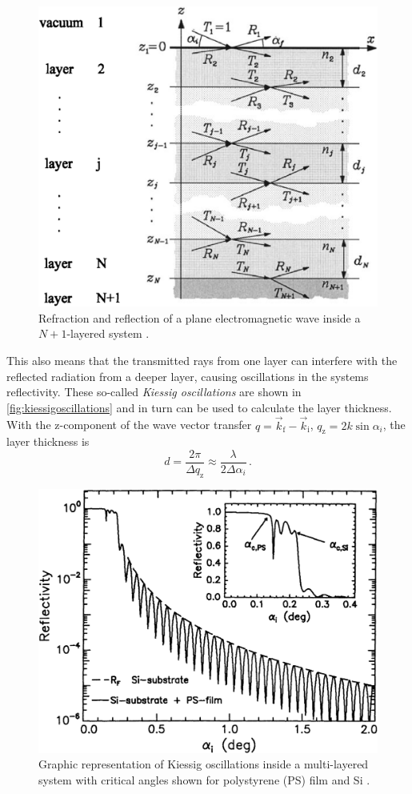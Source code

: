 \begin{figure}[H]
    \centering
    \includegraphics[width=.5\textwidth]{figures/multi_layer.png}
    \caption{Refraction and reflection of a plane electromagnetic wave inside a $N+1$-layered system \cite{tolan}.}
    \label{fig:multilayeredsystem}
\end{figure}
This also means that the transmitted rays from one layer can interfere with the reflected radiation from a deeper layer, 
causing oscillations in the systems reflectivity.
These so-called \textit{Kiessig oscillations} are shown in \autoref{fig:kiessigoscillations} and in turn can be used to calculate the layer thickness.
With the z-component of the wave vector transfer $q = \vec{k}_\text{f} - \vec{k}_\text{i}$, $q_\text{z} = 2 k \sin\alpha_i$, the layer thickness is
\begin{equation}
    d = \frac{2\pi}{\Delta q_\text{z}} \approx \frac{\lambda}{2 \Delta \alpha_i} \,.
    \label{eq:layerthickness}
\end{equation} 

\begin{figure}[H]
    \centering
    \includegraphics[width=.5\textwidth]{figures/kiessig_oszillation.png}
    \caption{Graphic representation of Kiessig oscillations inside a multi-layered system with critical angles shown for polystyrene (PS) film and Si \cite{tolan}.}
    \label{fig:kiessigoscillations}
\end{figure}

